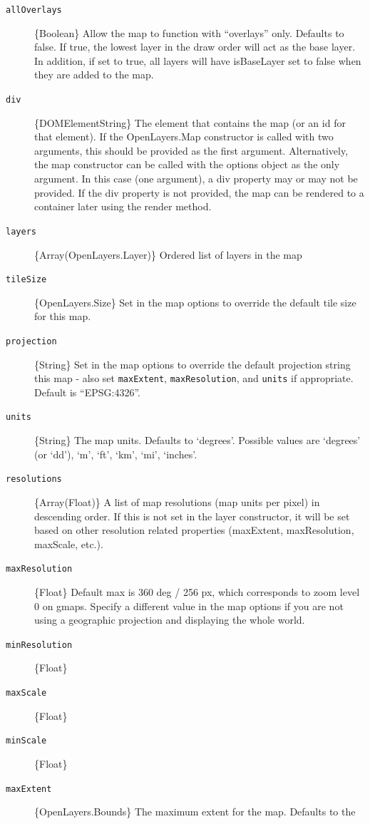 \documentclass[]{article}
\begin{document}
\begin{description}
\item[\texttt{allOverlays}]
\{Boolean\} Allow the map to function with ``overlays'' only. Defaults
to false. If true, the lowest layer in the draw order will act as the
base layer. In addition, if set to true, all layers will have
isBaseLayer set to false when they are added to the map.
\item[\texttt{div}]
\{DOMElement\textbar{}String\} The element that contains the map (or an
id for that element). If the OpenLayers.Map constructor is called with
two arguments, this should be provided as the first argument.
Alternatively, the map constructor can be called with the options object
as the only argument. In this case (one argument), a div property may or
may not be provided. If the div property is not provided, the map can be
rendered to a container later using the render method.
\item[\texttt{layers}]
\{Array(OpenLayers.Layer)\} Ordered list of layers in the map
\item[\texttt{tileSize}]
\{OpenLayers.Size\} Set in the map options to override the default tile
size for this map.
\item[\texttt{projection}]
\{String\} Set in the map options to override the default projection
string this map - also set \texttt{maxExtent}, \texttt{maxResolution},
and \texttt{units} if appropriate. Default is ``EPSG:4326''.
\item[\texttt{units}]
\{String\} The map units. Defaults to `degrees'. Possible values are
`degrees' (or `dd'), `m', `ft', `km', `mi', `inches'.
\item[\texttt{resolutions}]
\{Array(Float)\} A list of map resolutions (map units per pixel) in
descending order. If this is not set in the layer constructor, it will
be set based on other resolution related properties (maxExtent,
maxResolution, maxScale, etc.).
\item[\texttt{maxResolution}]
\{Float\} Default max is 360 deg / 256 px, which corresponds to zoom
level 0 on gmaps. Specify a different value in the map options if you
are not using a geographic projection and displaying the whole world.
\item[\texttt{minResolution}]
\{Float\}
\item[\texttt{maxScale}]
\{Float\}
\item[\texttt{minScale}]
\{Float\}
\item[\texttt{maxExtent}]
\{OpenLayers.Bounds\} The maximum extent for the map. Defaults to the

\end{description}
\end{document}
